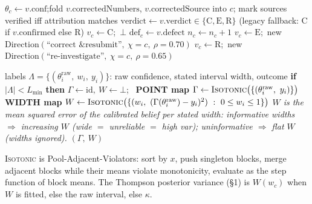 \documentclass[11pt]{article}
\newcommand{\Labels}{\Lambda}
\begin{document}
\begin{algorithm}[H]
\caption{\textsc{ApplyVerification}$(c,v)$ — three-state routing (Component D)}\label{alg:apply}
\begin{algorithmic}[1]
\State $\theta_c\gets v.\mathrm{conf}$;\quad fold $v.\mathrm{correctedNumbers}$, $v.\mathrm{correctedSource}$ into $c$; mark sources verified iff attribution matches
\State $\mathrm{verdict}\gets v.\mathrm{verdict}\in\{\mathrm{C,E,R}\}$ \quad(legacy fallback: $\mathrm{C}$ if $v.\mathrm{confirmed}$ else $\mathrm{R}$)
 \State $v_c\gets\mathrm{C}$;\ \Return $\bot$ \EndIf
\State $\mathrm{def}_c\gets v.\mathrm{defect}$
   \State $n_c\gets n_c+1$
    \State $v_c\gets\mathrm{E}$;\ \Return new $\mathrm{Direction}(\text{``correct \& resubmit''},\ \chi{=}c,\ \rho{=}0.70)$ \EndIf
   \State {}
\EndIf
\State $v_c\gets\mathrm{R}$;\ \Return new $\mathrm{Direction}(\text{``re-investigate''},\ \chi{=}c,\ \rho{=}0.65)$ 
\end{algorithmic}
\end{algorithm}

\begin{algorithm}[H]
\caption{\textsc{FitCalibrator}$(\Labels)$ — calibrate BOTH the point and the interval width (Component B)}\label{alg:cal}
\begin{algorithmic}[1]
\Require labels $\Labels=\{(\theta^{\mathrm{raw}}_i,\ w_i,\ y_i)\}$: raw confidence, stated interval width, outcome
\State \textbf{if} $|\Labels|<L_{\min}$ \textbf{then} $\Gamma\gets\mathrm{id},\ W\gets\bot$;\ \Return
\State \textbf{POINT map} $\Gamma\gets\textsc{Isotonic}\big(\{(\theta^{\mathrm{raw}}_i,\ y_i)\}\big)$ 
\State \textbf{WIDTH map} $W\gets\textsc{Isotonic}\big(\{(w_i,\ (\Gamma(\theta^{\mathrm{raw}}_i)-y_i)^2)\ :\ 0\le w_i\le1\}\big)$ 
\Statex \hfill \textit{$W$ is the mean squared error of the calibrated belief per stated width: informative widths}
\Statex \hfill \textit{$\Rightarrow$ increasing $W$ (wide $=$ unreliable $=$ high var); uninformative $\Rightarrow$ flat $W$ (widths ignored).}
\State \Return $(\Gamma,\ W)$
\end{algorithmic}
\end{algorithm}
\noindent\textsc{Isotonic} is Pool-Adjacent-Violators: sort by $x$, push singleton blocks, merge adjacent
blocks while their means violate monotonicity, evaluate as the step function of block means. The Thompson
posterior variance (\S1) is $W(w_c)$ when $W$ is fitted, else the raw interval, else $\kappa$.
\end{document}

